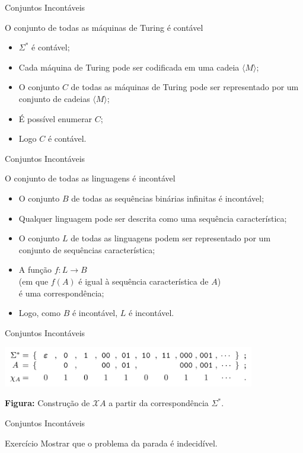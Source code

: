 \documentclass[xcolor=dvipsnames,table]{beamer}
\begin{document}
	\begin{frame}{Conjuntos Incontáveis}
		\begin{block}{O conjunto de todas as máquinas de Turing é contável}
			\begin{itemize}
				\item $\Sigma^*$ é contável;
				\item Cada máquina de Turing pode ser codificada em uma cadeia $\langle M \rangle$;
				\item O conjunto $C$ de todas as máquinas de Turing pode ser representado por um conjunto de cadeias $\langle M \rangle$;
				\item É possível enumerar $C$;
				\item Logo $C$ é contável.
			\end{itemize}
		\end{block}
	\end{frame}
	
	\begin{frame}{Conjuntos Incontáveis}
		\begin{block}{O conjunto de todas as linguagens é incontável}
			\begin{itemize}
				\item O conjunto $B$ de todas as sequências binárias infinitas é incontável;
				\item Qualquer linguagem pode ser descrita como uma sequência característica;
				\item O conjunto $L$ de todas as linguagens podem ser representado por um conjunto de sequências característica;
				\item A função $f : L \rightarrow B$ \\(em que $f(A)$ é igual à sequência característica de $A$) \\é uma correspondência;
				\item Logo, como $B$ é incontável, $L$ é incontável.
			\end{itemize}
		\end{block}
	\end{frame}
	
	\begin{frame}{Conjuntos Incontáveis}
		\begin{center}
    		\includegraphics[width=11cm]{images/seqCar.png}
    		
    		{\bf Figura:} Construção de $\mathcal{X}A$ a partir da correspondência $\Sigma^*$.
  		\end{center}
	\end{frame}
	
	\begin{frame}{Conjuntos Incontáveis}
		\begin{block}{Exercício}
			Mostrar que o problema da parada é indecidível.
		\end{block}
	\end{frame}
	
	\begin{frame}
		\titlepage
	\end{frame}
	
\end{document}
